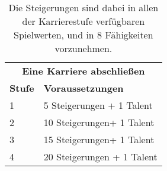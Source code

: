 \documentclass[a4paper, fontsize=11pt]{scrartcl}
\begin{document}
\begin{table}[!ht]
    \centering
    \begin{tabularx}{\textwidth}{l|X}
        \multicolumn{2}{c}{\cellcolor{gray!25} \textbf{Eine Karriere abschließen}                                                 } \\ \cline{1-2}
        \textbf{Stufe} & \textbf{Voraussetzungen}                                                                                   \\ \cline{1-2}
        1              & 5 Steigerungen + 1 Talent                                                                                  \\ \cline{1-2}
        2              & 10 Steigerungen+ 1 Talent                                                                                  \\ \cline{1-2}
        3              & 15 Steigerungen+ 1 Talent                                                                                  \\ \cline{1-2}
        4              & 20 Steigerungen + 1 Talent
    \end{tabularx}
    \caption{
        Die Steigerungen sind dabei in allen der Karrierestufe verfügbaren Spielwerten, und in 8 Fähigkeiten vorzunehmen.
    }
\end{table}
\end{document}

